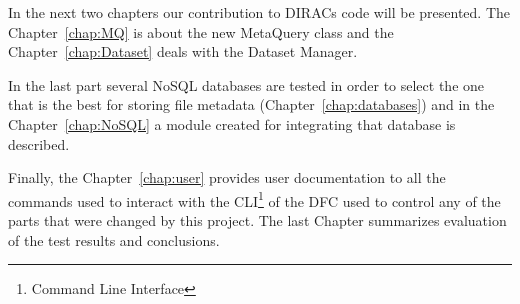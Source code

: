 In the next two chapters our contribution to DIRACs code will be presented. The Chapter~\ref{chap:MQ} 
is about the new MetaQuery class and the Chapter~\ref{chap:Dataset} deals with the Dataset Manager.

In the last part several NoSQL databases are tested in order to select the one that is the best for storing
file metadata (Chapter~\ref{chap:databases}) and in the Chapter~\ref{chap:NoSQL} a module created for integrating 
that database is described. 

Finally, the Chapter~\ref{chap:user} provides user documentation to all the commands used to interact with the 
CLI\footnote{Command Line Interface}
of the DFC used to control any of the parts that were changed by this project. The last Chapter
summarizes evaluation of the test results and conclusions.